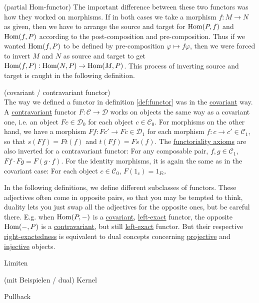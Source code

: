 \begin{example}{(partial Hom-functor)}
The important difference between these two functors was how they worked on morphisms. If in both cases we take a morphism
$f : M \rightarrow N$ as given, then we have to arrange the source and target for $\textup{Hom}(P,f)$ and $\textup{Hom}(f,P)$
according to the post-composition and pre-composition. Thus if we wanted $\textup{Hom}(f,P)$ to be defined by pre-composition
$\varphi \mapsto f\varphi$, then we were forced to invert $M$ and $N$ as source and target to get 
$\textup{Hom}(f,P): \textup{Hom}(N,P) \rightarrow \textup{Hom}(M,P)$. 
This process of inverting source and target is caught in the following definition.
\end{example}

\begin{definition}{(covariant / contravariant functor)}\\
The way we defined a functor in definition \ref{def:functor} was in the \ul{covariant} way.\\
A \ul{contravariant} functor $F : \mathcal{C} \rightarrow \mathcal{D}$ works on objects the same way as a covariant one, i.e.
an object $Fc \in \mathcal{D}_{0}$ for each object $c \in \mathcal{C}_{0}$. For morphisms on the other hand, we have
a morphism $F f : Fc' \rightarrow Fc \in \mathcal{D}_{1}$ for each morphism $f : c \rightarrow c' \in \mathcal{C}_{1}$, so that
$s(F f) = F t(f)$ and $t(F f) = F s(f)$.
The \ul{functoriality axioms} are also inverted for a contravariant functor:
For any composable pair, $f, g \in \mathcal{C}_{1}$, $F f \cdot F g = F(g \cdot f)$.
For the identity morphisms, it is again the same as in the covariant case:
For each object $c \in \mathcal{C}_{0}$, $F(1_{c}) = 1_{Fc}$.
\end{definition}

In the following definitions, we define different subclasses of functors. These adjectives often come in opposite pairs, so that you may be
tempted to think, duality lets you just swap all the adjectives for the opposite ones, but be careful there. E.g. when 
$\textup{Hom}(P,-)$ is a \ul{covariant}, \ul{left-exact} functor, the opposite $\textup{Hom}(-,P)$ is a \ul{contravariant}, but still \ul{left-exact} functor.
But their respective \ul{right-exactedness} is equivalent to dual concepts concerning \ul{projective} and \ul{injective} objects.

Limiten 

(mit Beispielen / dual)
Kernel

Pullback

